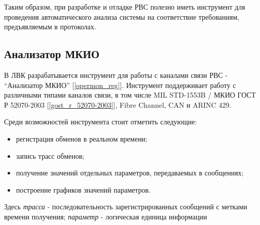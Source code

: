 Таким образом, при разработке и отладке РВС полезно иметь инструмент для 
проведения автоматического анализа системы на соответствие требованиям, 
предъявляемым в протоколах.

\subsection{Анализатор МКИО}

В ЛВК разрабатывается инструмент для работы с каналами связи РВС -  
``Анализатор МКИО'' [\ref{opermon_reg}]. Инструмент поддерживает работу с  
различными типами каналов связи, в том числе MIL STD-1553B / МКИО ГОСТ Р 
52070-2003 [\ref{gost_r_52070-2003}], Fibre Channel, CAN и ARINC 429.

Среди возможностей инструмента стоит отметить следующие:

\begin{itemize}
 \item регистрация обменов в реальном времени;
 \item запись трасс обменов;
 \item получение значений отдельных параметров, передаваемых в сообщениях;
 \item построение графиков значений параметров.
\end{itemize}

Здесь \textit{трасса} - последовательность зарегистрированных сообщений с 
метками времени получения; \textit{параметр} - логическая единица информации
